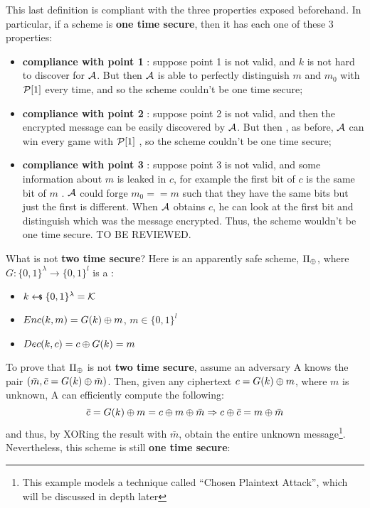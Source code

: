 This last definition is compliant with the three properties exposed beforehand. In particular, if a scheme is \textbf{one time secure}, then it has each one of these 3 properties:

\begin{itemize}
    \item \textbf{compliance with point 1} : suppose point 1 is not valid, and
        $k$ is not hard to discover for $ \Adv $. But then $ \Adv $ is able to perfectly
        distinguish $m$ and $m_{0}$ with $ \P [ 1 ]  $ every time, and so the
        scheme couldn't be one time secure;
    \item \textbf{compliance with point 2} : suppose point 2 is not valid, and
        then the encrypted message can be easily discovered by $ \Adv $. But
        then , as before, $ \Adv $ can win every game with $ \P [ 1 ]  $ , so
        the scheme couldn't be one time secure;
    \item \textbf{compliance with point 3} : suppose point 3 is not valid, and
        some information about $m$ is leaked in $c$, for example the first bit
        of $c$ is the same bit of $m$ . $\Adv $ could forge
        $m_{0}==m$ such that they have the same bits but just the first is
        different. When $\Adv $ obtains $c$, he can look at the first bit and
        distinguish which was the message encrypted. Thus, the scheme wouldn't
        be one time secure.
        TO BE REVIEWED.
\end{itemize}

What is not \textbf{two time secure}? Here is an apparently safe scheme, $\Pi_{\xor}$, where $G : \{0, 1\}^\lambda \to \{0, 1\}^l$ is a \prg:

\begin{itemize}
    \item $k \pickUAR \{0, 1\}^{\lambda} = \K$
    \item $Enc(k, m) = G(k) \xor m$, $m \in \{0, 1\}^{l}$
    \item $Dec(k, c) = c \xor G(k) = m$
\end{itemize}

To prove that $\Pi_{\xor}$ is not \textbf{two time secure}, assume an adversary \textsf{A} knows the pair $(\bar{m}, \bar{c} = G(k) \xor \bar{m})$. Then, given any ciphertext $c = G(k) \xor m$, where $m$ is unknown, \textsf{A} can efficiently compute the following: 
\[
    \bar{c} = G(k) \xor m = c \xor m \xor \bar{m} \Rightarrow c \xor \bar{c} = m \xor \bar{m} 
\]
and thus, by XORing the result with $\bar{m}$, obtain the entire unknown message\footnote{This example models a technique called ``Chosen Plaintext Attack'', which will be discussed in depth later}. Nevertheless, this scheme is still \textbf{one time secure}:

